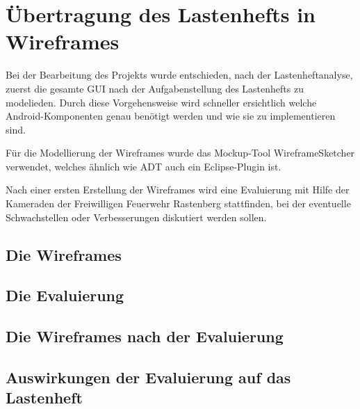 \section{\"Ubertragung des Lastenhefts in Wireframes}

Bei der Bearbeitung des Projekts wurde entschieden, nach der Lastenheftanalyse, zuerst die gesamte GUI nach der Aufgabenstellung des Lastenhefts zu modelieden. Durch diese Vorgehensweise wird schneller ersichtlich welche Android-Komponenten genau ben\"otigt werden und wie sie zu implementieren sind.

F\"ur die Modellierung der Wireframes wurde das Mockup-Tool WireframeSketcher verwendet, welches \"ahnlich wie \ac{ADT} auch ein Eclipse-Plugin ist. 

Nach einer ersten Erstellung der Wireframes wird eine Evaluierung mit Hilfe der Kameraden der Freiwilligen Feuerwehr Rastenberg stattfinden, bei der eventuelle Schwachstellen oder Verbesserungen diskutiert werden sollen.

\subsection{Die Wireframes}

\subsection{Die Evaluierung}

\subsection{Die Wireframes nach der Evaluierung}

\subsection{Auswirkungen der Evaluierung auf das Lastenheft}